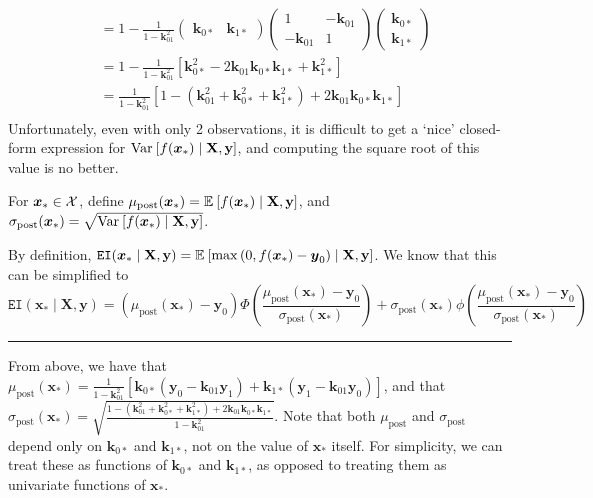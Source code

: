 \documentclass[11pt]{article}
\numberwithin{figure}{section}
\numberwithin{equation}{section}
\def\EI{\texttt{EI}}
\newcommand{\bs}[1]{\boldsymbol{#1}}
\def\bsx{\bs{x}}
\def\bsy{\bs{y}}
\def\bsk{\bs{k}}
\def\xast{\bsx_{*}}
\begin{document}
\begin{align*}
&= 1 - \frac{1}{1 - \bsk_{01}^{2}}\begin{pmatrix}\bsk_{0*} & \bsk_{1*}\end{pmatrix}\begin{pmatrix}1 & -\bsk_{01}\\ -\bsk_{01} & 1\end{pmatrix}\begin{pmatrix}\bsk_{0*}\\ \bsk_{1*}\end{pmatrix}\\
&= 1 - \frac{1}{1 - \bsk_{01}^{2}}\left[\bsk_{0*}^{2} - 2\bsk_{01}\bsk_{0*}\bsk_{1*} + \bsk_{1*}^{2}\right]\\
&= \frac{1}{1 - \bsk_{01}^{2}}\left[1 - \left(\bsk_{01}^{2} + \bsk_{0*}^{2} + \bsk_{1*}^{2}\right) + 2\bsk_{01}\bsk_{0*}\bsk_{1*}\right]\\
\end{align*}
Unfortunately, even with only 2 observations, it is difficult to get a `nice' closed-form expression for $\var{f(\xast) \mid \mathbf{X}, \mathbf{y}}$, and computing the square root of this value is no better. 

For $\xast \in \calX$, define $\mu_{\textrm{post}}(\xast) = \expec{f(\xast) \mid \mathbf{X}, \mathbf{y}}$, and $\sigma_{\textrm{post}}(\xast) = \sqrt{\var{f(\xast) \mid \mathbf{X}, \mathbf{y}}}$.

By definition, $\EI(\xast \mid \mathbf{X}, \mathbf{y}) = \expec{\max\left(0, f(\xast) - \bsy_{0}\right) \mid \mathbf{X}, \mathbf{y}}$. We know that this can be simplified to 
\begin{equation*}
\EI(\xast \mid \mathbf{X}, \mathbf{y}) = \left(\mu_{\textrm{post}}(\xast) - \bsy_{0}\right)\Phi\left(\frac{\mu_{\textrm{post}}(\xast) - \bsy_{0}}{\sigma_{\textrm{post}}(\xast)}\right) + \sigma_{\textrm{post}}(\xast)\phi\left(\frac{\mu_{\textrm{post}}(\xast) - \bsy_{0}}{\sigma_{\textrm{post}}(\xast)}\right)
\end{equation*}
\noindent\rule{\textwidth}{0.8pt}

From above, we have that $\mu_{\textrm{post}}(\xast) = \frac{1}{1 - \bsk_{01}^2}\left[\bsk_{0*}\left(\bsy_{0} - \bsk_{01}\bsy_{1}\right) + \bsk_{1*}\left(\bsy_{1} - \bsk_{01}\bsy_{0}\right)\right]$, and that $\sigma_{\textrm{post}}(\xast) = \sqrt{\frac{1 - \left(\bsk_{01}^{2} + \bsk_{0*}^{2} + \bsk_{1*}^{2}\right) + 2\bsk_{01}\bsk_{0*}\bsk_{1*}}{1 - \bsk_{01}^{2}}}$. Note that both $\mu_{\textrm{post}}$ and $\sigma_{\textrm{post}}$ depend only on $\bsk_{0*}$ and $\bsk_{1*}$, not on the value of $\xast$ itself. For simplicity, we can treat these as functions of $\bsk_{0*}$ and $\bsk_{1*}$, as opposed to treating them as univariate functions of $\xast$. 
\end{document}
